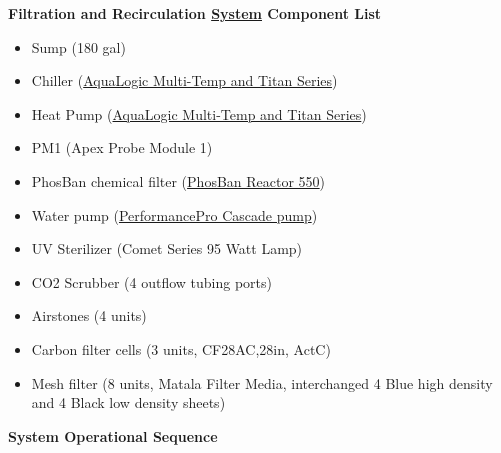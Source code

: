 \documentclass[]{book}
\providecommand{\tightlist}{%
  \setlength{\itemsep}{0pt}\setlength{\parskip}{0pt}}
\begin{document}
 \textbf{Filtration and Recirculation
\href{https://github.com/dbarnas/Mesocosm_User_Manual/blob/master/Manuals/Filtration_Skid_Build_Package.pdf}{System}
Component List}

\begin{itemize}
\tightlist
\item
  Sump (180 gal)\\
\item
  Chiller (\href{Manuals/AquaLogic_Chiller.pdf}{AquaLogic Multi-Temp and
  Titan Series})\\
\item
  Heat Pump (\href{Manuals/AquaLogic_Chiller.pdf}{AquaLogic Multi-Temp
  and Titan Series})\\
\item
  PM1 (Apex Probe Module 1)\\
\item
  PhosBan chemical filter (\href{Manuals/Phosban_Reactor.pdf}{PhosBan
  Reactor 550})\\
\item
  Water pump (\href{Manuals/Complete_Cascade.pdf}{PerformancePro Cascade
  pump})\\
\item
  UV Sterilizer (Comet Series 95 Watt Lamp)\\
\item
  CO2 Scrubber (4 outflow tubing ports)
\item
  Airstones (4 units)\\
\item
  Carbon filter cells (3 units, CF28AC,28in, ActC)\\
\item
  Mesh filter (8 units, Matala Filter Media, interchanged 4 Blue high
  density and 4 Black low density sheets)
\end{itemize}

 \textbf{System Operational Sequence}
\end{document}
